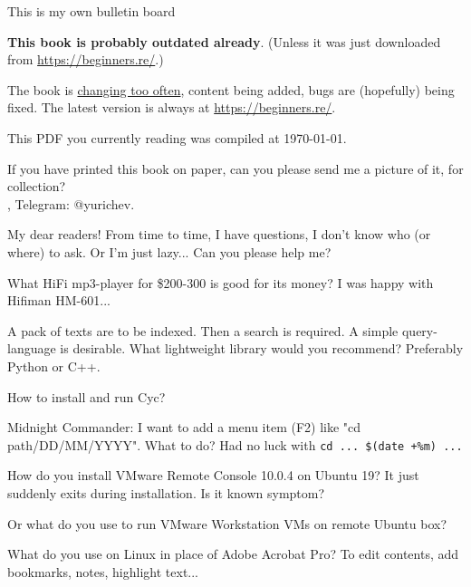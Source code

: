 
\begin{center}
\LARGE{} This is my own bulletin board \normalsize{}
\end{center}

\textbf{This book is probably outdated already}.
(Unless it was just downloaded from \url{https://beginners.re/}.)

The book is \href{https://github.com/DennisYurichev/RE-for-beginners/commits/master}{changing too often},
content being added, bugs are (hopefully) being fixed.
The latest version is always at \url{https://beginners.re/}.

This PDF you currently reading was compiled at \today{}.

\myhrule{}

If you have printed this book on paper, can you please send me a picture of it, for collection?\\
\EMAIL{}, Telegram: @yurichev.

\myhrule{}

My dear readers! From time to time, I have questions, I don't know who (or where) to ask.
Or I'm just lazy...
Can you please help me?

\myhrule{}

What HiFi mp3-player for \$200-300 is good for its money?
I was happy with Hifiman HM-601...

\myhrule{}

A pack of texts are to be indexed. Then a search is required. A simple query-language is desirable.
What lightweight library would you recommend?
Preferably Python or C++.

\myhrule{}

How to install and run Cyc?

\myhrule{}

Midnight Commander: I want to add a menu item (F2) like "cd path/DD/MM/YYYY".
What to do?
Had no luck with \verb|cd ... $(date +%m) ...|

\myhrule{}

How do you install VMware Remote Console 10.0.4 on Ubuntu 19? It just suddenly exits during installation.
Is it known symptom?

Or what do you use to run VMware Workstation VMs on remote Ubuntu box?

\myhrule{}

What do you use on Linux in place of Adobe Acrobat Pro?
To edit contents, add bookmarks, notes, highlight text...

